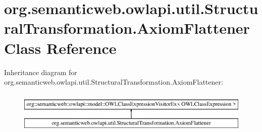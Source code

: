 \hypertarget{classorg_1_1semanticweb_1_1owlapi_1_1util_1_1_structural_transformation_1_1_axiom_flattener}{\section{org.\-semanticweb.\-owlapi.\-util.\-Structural\-Transformation.\-Axiom\-Flattener Class Reference}
\label{classorg_1_1semanticweb_1_1owlapi_1_1util_1_1_structural_transformation_1_1_axiom_flattener}
}
Inheritance diagram for org.\-semanticweb.\-owlapi.\-util.\-Structural\-Transformation.\-Axiom\-Flattener\-:\begin{figure}[H]
\begin{center}
\leavevmode
\includegraphics[height=2.000000cm]{classorg_1_1semanticweb_1_1owlapi_1_1util_1_1_structural_transformation_1_1_axiom_flattener}
\end{center}
\end{figure}
